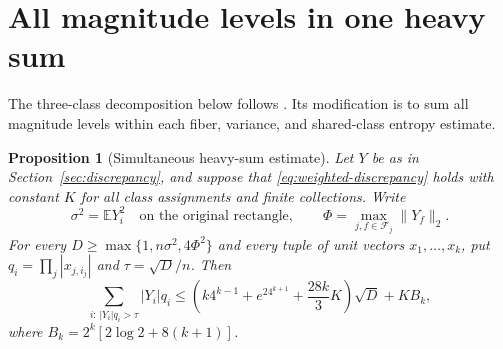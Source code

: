 \documentclass[11pt]{article}
\theoremstyle{spaced}
\newtheorem{proposition}[theorem]{Proposition}
\theoremstyle{remark}
\numberwithin{equation}{section}
\newcommand{\E}{\mathbb E}
\begin{document}
\section{All magnitude levels in one heavy sum}\label{sec:heavy}

The three-class decomposition below follows
\cite[Proposition~4.6]{ZZ}. Its modification is to sum all magnitude
levels within each fiber, variance, and shared-class entropy estimate.

\begin{proposition}[Simultaneous heavy-sum estimate]\label{prop:heavy}
Let $Y$ be as in Section~\ref{sec:discrepancy}, and suppose that
\eqref{eq:weighted-discrepancy} holds with constant $K$ for all class
assignments and finite collections. Write
\[
 \sigma^2=\E Y_i^2\quad\text{on the original rectangle},
 \qquad \Phi=\max_{j,f\in\mathcal F_j}\|Y_f\|_2.
\]
For every $D\ge\max\{1,n\sigma^2,4\Phi^2\}$ and every tuple of unit
vectors $x_1,\ldots,x_k$, put
$q_i=\prod_j|x_{j,i_j}|$ and $\tau=\sqrt D/n$. Then
\begin{equation}\label{eq:heavy}
 \sum_{i:\,|Y_i|q_i>\tau}|Y_i|q_i
 \le\left(k4^{k-1}+e^24^{k+1}+\frac{28k}{3}K\right)\sqrt D+KB_k,
\end{equation}
where $B_k=2^k[2\log2+8(k+1)]$.
\end{proposition}
\end{document}
